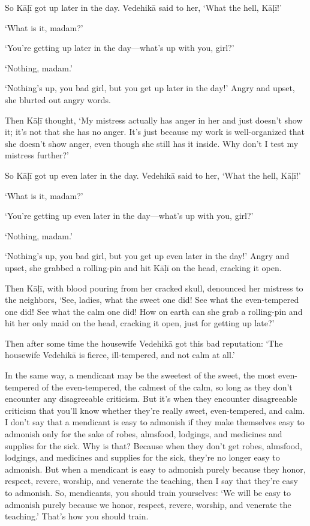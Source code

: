 \documentclass[12pt,openany]{book}%
\begin{document}
So \textsanskrit{Kāḷī} got up later in the day. \textsanskrit{Vedehikā} said to her, ‘What the hell, \textsanskrit{Kāḷī}!’ 

‘What is it, madam?’ 

‘You’re getting up later in the day—what’s up with you, girl?’ 

‘Nothing, madam.’ 

‘Nothing’s up, you bad girl, but you get up later in the day!’ Angry and upset, she blurted out angry words. 

Then \textsanskrit{Kāḷī} thought, ‘My mistress actually has anger in her and just doesn’t show it; it’s not that she has no anger. It’s just because my work is well-organized that she doesn’t show anger, even though she still has it inside. Why don’t I test my mistress further?’ 

So \textsanskrit{Kāḷī} got up even later in the day. \textsanskrit{Vedehikā} said to her, ‘What the hell, \textsanskrit{Kāḷī}!’ 

‘What is it, madam?’ 

‘You’re getting up even later in the day—what’s up with you, girl?’ 

‘Nothing, madam.’ 

‘Nothing’s up, you bad girl, but you get up even later in the day!’ Angry and upset, she grabbed a rolling-pin and hit \textsanskrit{Kāḷī} on the head, cracking it open. 

Then \textsanskrit{Kāḷī}, with blood pouring from her cracked skull, denounced her mistress to the neighbors, ‘See, ladies, what the sweet one did! See what the even-tempered one did! See what the calm one did! How on earth can she grab a rolling-pin and hit her only maid on the head, cracking it open, just for getting up late?’ 

Then after some time the housewife \textsanskrit{Vedehikā} got this bad reputation: ‘The housewife \textsanskrit{Vedehikā} is fierce, ill-tempered, and not calm at all.’ 

In the same way, a mendicant may be the sweetest of the sweet, the most even-tempered of the even-tempered, the calmest of the calm, so long as they don’t encounter any disagreeable criticism. But it’s when they encounter disagreeable criticism that you’ll know whether they’re really sweet, even-tempered, and calm. I don’t say that a mendicant is easy to admonish if they make themselves easy to admonish only for the sake of robes, almsfood, lodgings, and medicines and supplies for the sick. Why is that? Because when they don’t get robes, almsfood, lodgings, and medicines and supplies for the sick, they’re no longer easy to admonish. But when a mendicant is easy to admonish purely because they honor, respect, revere, worship, and venerate the teaching, then I say that they’re easy to admonish. So, mendicants, you should train yourselves: ‘We will be easy to admonish purely because we honor, respect, revere, worship, and venerate the teaching.’ That’s how you should train. 
\end{document}
